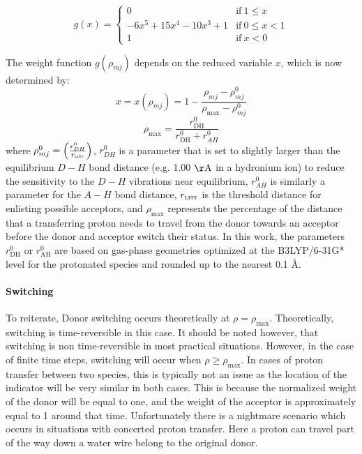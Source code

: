 \documentclass{article}
\newcommand{\mr}[1]{\mathrm{#1}}
\begin{document}
\begin{equation} \label{eq:gofx_weight}
g(x) = \begin{cases}
0
& \mathrm{if}\ 1 \leq x \\
-6x^5 + 15x^4 - 10x^3 + 1
& \mathrm{if}\  0 \leq x < 1 \\
1
& \mathrm{if}\ x < 0 
\end{cases}
\end{equation}

The weight function $g ( \rho_{mj} )$ depends on the reduced variable $x$, which is now determined by:
\begin{equation}\label{eq:xmj}
x = x ( \rho_{mj} ) = 1 - \frac{\rho_{mj} - \rho^0_{mj}}{\rho_{\mathrm{max}} - \rho^0_{mj}}
\end{equation}
\begin{equation}
\rho_{\mathrm{max}} = \frac{r^0_{\mathrm{DH}}}{r^0_{\mathrm{DH}}+r^0_{AH}}
\end{equation}
where $\rho^0_{mj} = \left( \frac{r^0_{DH}}{r_{\mathrm{\textsc{list}}}} \right)$, $r^0_{DH}$ is a parameter that is set to slightly larger than the equilibrium $D-H$ bond distance (e.g. 1.00 $\mathrm{\AA}$ in a hydronium ion) to reduce the sensitivity to the $D-H$ vibrations near equilibrium, $r^0_{AH}$ is similarly a parameter for the $A-H$ bond distance, $r_{\mathrm{\textsc{list}}}$ is the threshold distance for enlisting possible acceptors, and $\rho_{\mathrm{max}}$ represents the percentage of the distance that a transferring proton needs to travel from the donor towards an acceptor before the donor and acceptor switch their status.
In this work, the parameters $r^0_{\mr{DH}}$ or $r^0_{\mr{AH}}$ are based on gas-phase geometries optimized at the B3LYP/6-31G* level for the protonated species and rounded up to the nearest 0.1 \AA.

\paragraph{Switching}
To reiterate, Donor switching occurs theoretically at $\rho = \rho_{\mr{max}}$.
Theoretically, switching is time-reversible in this case.
It should be noted however, that switching is non time-reversible in most practical situations. 
However, in the case of finite time steps, switching will occur when $\rho \geq \rho_{\mr{max}}$.
In cases of proton transfer between two species, this is typically not an issue as the location of the indicator will be very similar in both cases.
This is because the normalized weight of the donor will be equal to one, and the weight of the acceptor is approximately equal to 1 around that time.
Unfortunately there is a nightmare scenario which occurs in situations with concerted proton transfer.
Here a proton can travel part of the way down a water wire belong to the original donor.
\end{document}
